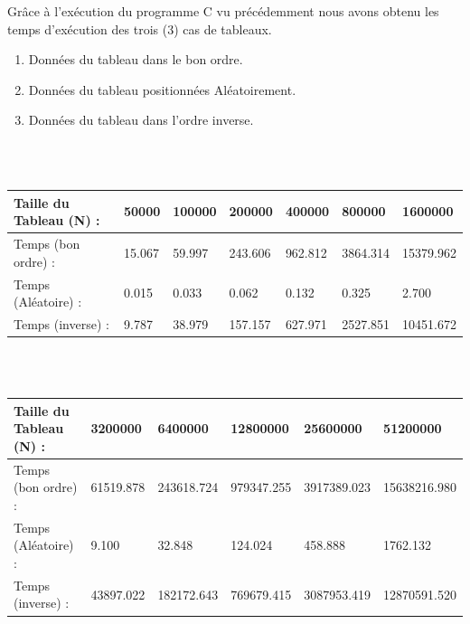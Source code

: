 \documentclass[12pt]{article}
\begin{document}
Grâce à l'exécution du programme C vu précédemment nous avons obtenu les temps d'exécution des trois (3) cas de tableaux.
\begin{enumerate}
	\item Données du tableau dans le bon ordre.
	\item Données du tableau positionnées Aléatoirement.
	\item Données du tableau dans l'ordre inverse.
\end{enumerate}
\color{blue}
\textrm{  }
\\
\\
\begin{tabular}{|p{4cm}||p{1.8cm}|p{1.8cm}|p{1.8cm}|p{1.8cm}|p{1.8cm}|p{1.8cm}|}
\hline
Taille du Tableau (N) : & 50000 & 100000 & 200000 & 400000 & 800000  & 1600000\\
\hline
Temps (bon ordre) : & 15.067 & 59.997 & 243.606 & 962.812 & 3864.314 & 15379.962 \\
\hline

Temps (Aléatoire) : & 0.015 & 0.033 & 0.062 & 0.132 & 0.325 & 2.700 \\
\hline

Temps (inverse) :  & 9.787 & 38.979 & 157.157 & 627.971 & 2527.851 & 10451.672  \\
\hline

\end{tabular}
\\
\\
\begin{tabular}{|p{4cm}||p{2.25cm}|p{2.25cm}|p{2.25cm}|p{2.25cm}|p{2.25cm}|}
\hline
Taille du Tableau (N) : & 3200000 & 6400000 & 12800000 & 25600000 &  51200000  \\
\hline

Temps (bon ordre) : &  61519.878 & 243618.724 & 979347.255 & 3917389.023 & 15638216.980   \\
\hline

Temps (Aléatoire) : & 9.100 & 32.848 & 124.024 & 458.888 & 1762.132  \\
\hline

Temps (inverse) : & 43897.022 & 182172.643 & 769679.415 & 3087953.419 & 12870591.520  \\
\hline

\end{tabular}
\color{black}
\end{document}
